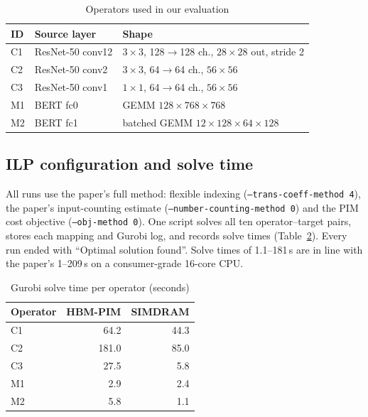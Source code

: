 \documentclass[conference]{IEEEtran}
\begin{document}
\begin{table}[t]
\centering
\caption{Operators used in our evaluation}
\label{tab:ops}
\footnotesize
\begin{tabular}{lll}
\toprule
ID & Source layer & Shape \\
\midrule
C1 & ResNet-50 conv12 & $3{\times}3$, 128$\to$128 ch., $28{\times}28$ out, stride 2 \\
C2 & ResNet-50 conv2  & $3{\times}3$, 64$\to$64 ch., $56{\times}56$ \\
C3 & ResNet-50 conv1  & $1{\times}1$, 64$\to$64 ch., $56{\times}56$ \\
M1 & BERT fc0         & GEMM $128{\times}768{\times}768$ \\
M2 & BERT fc1         & batched GEMM $12{\times}128{\times}64{\times}128$ \\
\bottomrule
\end{tabular}
\end{table}

\subsection{ILP configuration and solve time}
All runs use the paper's full method: flexible indexing
(\texttt{--trans-coeff-method 4}), the paper's input-counting estimate
(\texttt{--number-counting-method 0}) and the PIM cost objective
(\texttt{--obj-method 0}). One script solves all ten operator--target pairs,
stores each mapping and Gurobi log, and records solve times
(Table~\ref{tab:solve}). Every run ended with ``Optimal solution found''. Solve
times of 1.1--181\,s are in line with the paper's 1--209\,s on a consumer-grade
16-core CPU.

\begin{table}[t]
\centering
\caption{Gurobi solve time per operator (seconds)}
\label{tab:solve}
\footnotesize
\begin{tabular}{lrr}
\toprule
Operator & HBM-PIM & SIMDRAM \\
\midrule
C1 & 64.2 & 44.3 \\
C2 & 181.0 & 85.0 \\
C3 & 27.5 & 5.8 \\
M1 & 2.9 & 2.4 \\
M2 & 5.8 & 1.1 \\
\bottomrule
\end{tabular}
\end{table}
\end{document}
